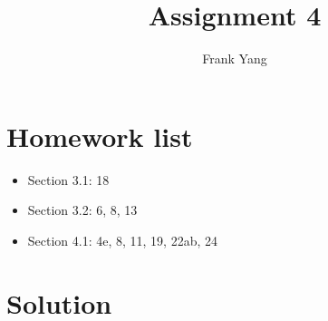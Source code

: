 \documentclass[a4paper]{article}
\title{Assignment 4}
\author{Frank Yang}
\begin{document}
\maketitle
\section{Homework list}

\begin{itemize}


\item Section  3.1:  18
\item Section 3.2:  6, 8, 13
\item Section 4.1:  4e, 8, 11, 19, 22ab, 24
\end{itemize}

\section{Solution}
\end{document}
